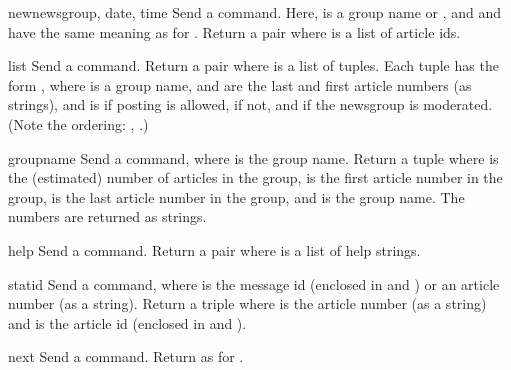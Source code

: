 \begin{methoddesc}{newnews}{group, date, time}
Send a  command.  Here,  is a group name or
, and  and  have the same meaning as for
.  Return a pair  where  is a list of article ids.
\end{methoddesc}

\begin{methoddesc}{list}{}
Send a  command.  Return a pair  where  is a list of tuples.  Each tuple has the
form , where
 is a group name,  and  are the last
and first article numbers (as strings), and  is 
if posting is allowed,  if not, and  if the
newsgroup is moderated.  (Note the ordering: , .)
\end{methoddesc}

\begin{methoddesc}{group}{name}
Send a  command, where  is the group name.
Return a tuple \code{(}\code{,} \code{,}
\code{,} \code{,} \code{)} where
 is the (estimated) number of articles in the group,
 is the first article number in the group,  is
the last article number in the group, and  is the group
name.  The numbers are returned as strings.
\end{methoddesc}

\begin{methoddesc}{help}{}
Send a  command.  Return a pair  where  is a list of help strings.
\end{methoddesc}

\begin{methoddesc}{stat}{id}
Send a  command, where  is the message id (enclosed
in \character{<} and \character{>}) or an article number (as a string).
Return a triple  where
 is the article number (as a string) and  is the
article id  (enclosed in \character{<} and \character{>}).
\end{methoddesc}

\begin{methoddesc}{next}{}
Send a  command.  Return as for .
\end{methoddesc}

